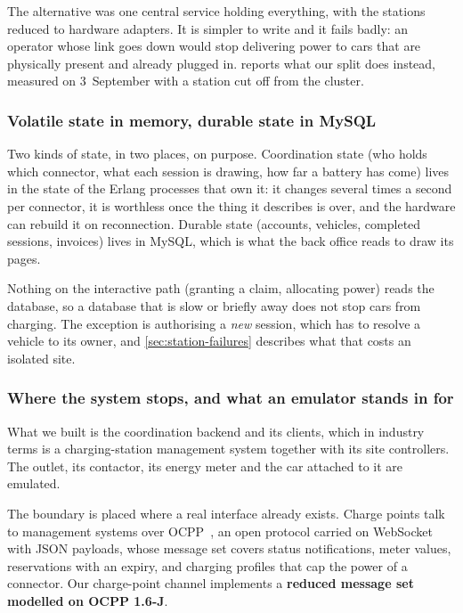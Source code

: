 The alternative was one central service holding everything, with the stations reduced to
hardware adapters. It is simpler to write and it fails badly: an operator whose link goes
down would stop delivering power to cars that are physically present and already plugged in.
 reports what our split does instead, measured on 3~September
with a station cut off from the cluster.

\subsubsection{Volatile state in memory, durable state in MySQL}
\label{sec:state-split}

Two kinds of state, in two places, on purpose. Coordination state (who holds which
connector, what each session is drawing, how far a battery has come) lives in the state of
the Erlang processes that own it: it changes several times a second per connector, it is
worthless once the thing it describes is over, and the hardware can rebuild it on
reconnection. Durable state (accounts, vehicles, completed sessions, invoices) lives in
MySQL, which is what the back office reads to draw its pages.

Nothing on the interactive path (granting a claim, allocating power) reads the database, so a database that is slow or briefly away does not stop
cars from charging. The exception is authorising a \emph{new} session, which has to resolve
a vehicle to its owner, and \cref{sec:station-failures} describes what that costs an
isolated site.

\subsubsection{Where the system stops, and what an emulator stands in for}
\label{sec:boundary}

What we built is the coordination backend and its clients, which in industry terms is a
charging-station management system together with its site controllers. The outlet, its contactor, its energy meter and the car attached to it are emulated.

The boundary is placed where a real interface already exists. Charge points talk to
management systems over OCPP~\cite{ocpp16j}, an open protocol carried on WebSocket with JSON payloads,
whose message set covers status notifications, meter values,
reservations with an expiry, and charging profiles that cap the power of a connector. Our
charge-point channel implements a \textbf{reduced message set modelled on OCPP 1.6-J}.

